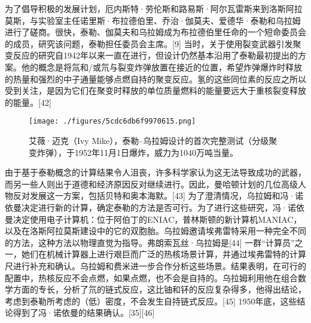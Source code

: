 为了倡导积极的发展计划，厄内斯特·劳伦斯和路易斯·阿尔瓦雷斯来到洛斯阿拉莫斯，与实验室主任诺里斯·布拉德伯里、乔治·伽莫夫、爱德华·泰勒和乌拉姆进行了磋商。很快，泰勒、伽莫夫和乌拉姆成为布拉德伯里任命的一个短命委员会的成员，研究该问题，泰勒担任委员会主席。[9] 当时，关于使用裂变武器引发聚变反应的研究自1942年以来一直在进行，但设计仍然基本沿用了泰勒最初提出的方案。他的概念是将氚和/或氘与裂变炸弹放置在接近的位置，希望炸弹爆炸时释放的热量和强烈的中子通量能够点燃自持的聚变反应。氢的这些同位素的反应之所以受到关注，是因为它们在聚变时释放的单位质量燃料的能量要远大于重核裂变释放的能量。[42]
\begin{figure}[ht]
\centering
\texttt{[image: ./figures/5cdc6db6f9970615.png]}
\caption{艾薇·迈克（Ivy Mike），泰勒–乌拉姆设计的首次完整测试（分级聚变炸弹），于1952年11月1日爆炸，威力为1040万吨当量。} \label{fig_Ulam_5}
\end{figure}
由于基于泰勒概念的计算结果令人沮丧，许多科学家认为这无法导致成功的武器，而另一些人则出于道德和经济原因反对继续进行。因此，曼哈顿计划的几位高级人物反对发展这一方案，包括贝特和奥本海默。[43] 为了澄清情况，乌拉姆和冯·诺依曼决定进行新的计算，确定泰勒的方法是否可行。为了进行这些研究，冯·诺依曼决定使用电子计算机：位于阿伯丁的ENIAC，普林斯顿的新计算机MANIAC，以及在洛斯阿拉莫斯建设中的它的双胞胎。乌拉姆邀请埃弗雷特采用一种完全不同的方法，这种方法以物理直觉为指导。弗朗索瓦丝·乌拉姆是[44] 一群“计算员”之一，她们在机械计算器上进行艰巨而广泛的热核场景计算，并通过埃弗雷特的计算尺进行补充和确认。乌拉姆和费米进一步合作分析这些场景。结果表明，在可行的配置中，热核反应不会点燃，如果点燃，也不会是自持的。乌拉姆利用他在组合数学方面的专长，分析了氘的链式反应，这比铀和钚的反应复杂得多，他得出结论，考虑到泰勒所考虑的（低）密度，不会发生自持链式反应。[45] 1950年底，这些结论得到了冯·诺依曼的结果确认。[35][46]


